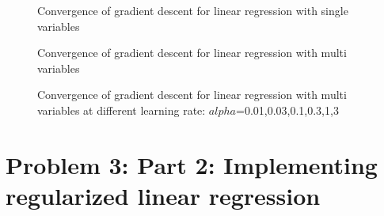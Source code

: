 \documentclass{article}
\begin{document}
\begin{figure}[h]

	\caption{Convergence of gradient descent for linear regression with single variables}\label{fig:4}
\end{figure}
\begin{figure}[h]
	
	\caption{Convergence of gradient descent for linear regression with multi variables}\label{fig:5}
\end{figure}
\begin{figure}[h]
\caption{Convergence of gradient descent for linear regression with multi variables at different learning rate: $alpha$=0.01,0.03,0.1,0.3,1,3}
\label{fig:66}
\end{figure}

\section{Problem 3: Part 2: Implementing regularized linear regression}
\end{document}

